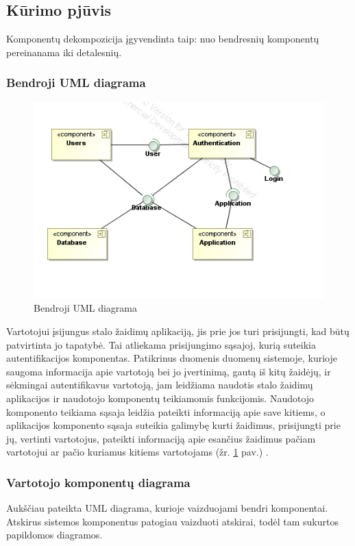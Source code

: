 \documentclass{VUMIFPSkursinis}
\begin{document}
\subsection{Kūrimo pjūvis}
Komponentų dekompozicija įgyvendinta taip: nuo bendresnių komponentų pereinanama iki detalesnių.

	\subsubsection{Bendroji UML diagrama}
		\begin{figure}[H]
			\centering
			\includegraphics[scale=0.6]{img/UMLComponent1}
			\caption{Bendroji UML diagrama}
			\label{img:UMLComponent1}
		\end{figure}
		Vartotojui įsijungus stalo žaidimų aplikaciją, jis prie jos turi prisijungti, kad būtų patvirtinta jo tapatybė. Tai atliekama prisijungimo sąsajoj, kurią suteikia autentifikacijos komponentas. Patikrinus duomenis duomenų sistemoje, kurioje saugoma informacija apie vartotoją bei jo įvertinimą, gautą iš kitų žaidėjų, ir sėkmingai autentifikavus vartotoją, jam leidžiama naudotis stalo žaidimų aplikacijos ir naudotojo komponentų teikiamomis funkcijomis. Naudotojo komponento teikiama sąsaja leidžia pateikti informaciją apie save kitiems, o aplikacijos komponento sąsaja suteikia galimybę kurti žaidimus, prisijungti prie jų, vertinti vartotojus, pateikti informaciją apie esančius žaidimus pačiam vartotojui ar pačio kuriamus kitiems vartotojams (žr. \ref{img:UMLComponent1} pav.) .
		
		\subsubsection{Vartotojo komponentų diagrama}
		Aukščiau pateikta UML diagrama, kurioje vaizduojami bendri komponentai. Atskirus sistemos komponentus patogiau vaizduoti atskirai, todėl tam sukurtos papildomos diagramos.
		
\end{document}

